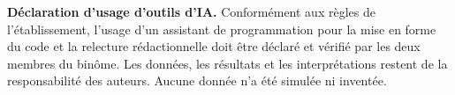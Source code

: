 \documentclass[11pt,a4paper]{article}
\begin{document}
\textbf{Déclaration d'usage d'outils d'IA.} Conformément aux règles de
l'établissement, l'usage d'un assistant de programmation pour la mise en forme
du code et la relecture rédactionnelle doit être déclaré et vérifié par les deux
membres du binôme. Les données, les résultats et les interprétations restent de
la responsabilité des auteurs. Aucune donnée n'a été simulée ni inventée.
\end{document}

